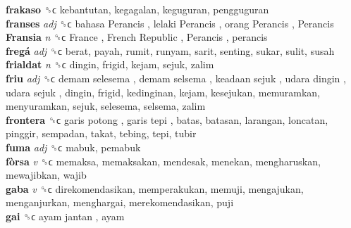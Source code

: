 \textbf{frakaso} ␝ϲ  kebantutan, kegagalan, keguguran, pengguguran  \\
\textbf{franses} \emph{adj}  ␝ϲ   bahasa Perancis ,  lelaki Perancis ,  orang Perancis ,  Perancis   \\
\textbf{Fransia} \emph{n}  ␝ϲ   France ,  French Republic ,  Perancis , perancis  \\
\textbf{fregá} \emph{adj}  ␝ϲ  berat, payah, rumit, runyam, sarit, senting, sukar, sulit, susah  \\
\textbf{frialdat} \emph{n}  ␝ϲ  dingin, frigid, kejam, sejuk, zalim  \\
\textbf{friu} \emph{adj}  ␝ϲ   demam selesema ,  demam selsema ,  keadaan sejuk ,  udara dingin ,  udara sejuk , dingin, frigid, kedinginan, kejam, kesejukan, memuramkan, menyuramkan, sejuk, selesema, selsema, zalim  \\
\textbf{frontera} ␝ϲ   garis potong ,  garis tepi , batas, batasan, larangan, loncatan, pinggir, sempadan, takat, tebing, tepi, tubir  \\
\textbf{fuma} \emph{adj}  ␝ϲ  mabuk, pemabuk  \\
\textbf{fòrsa} \emph{v}  ␝ϲ  memaksa, memaksakan, mendesak, menekan, mengharuskan, mewajibkan, wajib  \\
\textbf{gaba} \emph{v}  ␝ϲ  direkomendasikan, memperakukan, memuji, mengajukan, menganjurkan, menghargai, merekomendasikan, puji  \\
\textbf{gai} ␝ϲ   ayam jantan , ayam  \\
